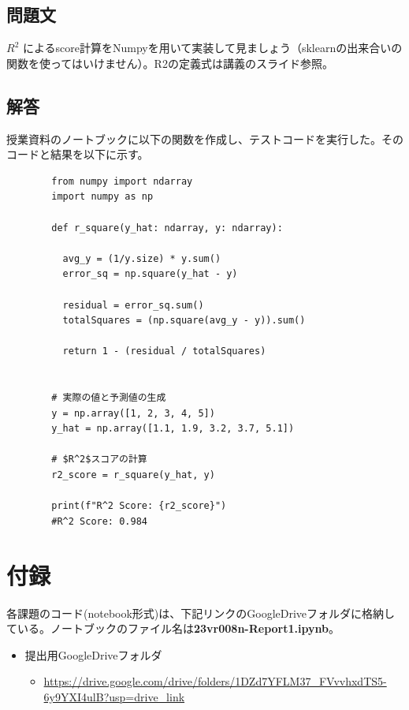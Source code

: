 \documentclass{article}[jsarticle]
\begin{document}
    \subsection{問題文}
    $R^2$ によるscore計算をNumpyを用いて実装して見ましょう（sklearnの出来合いの関数を使ってはいけません）。R2の定義式は講義のスライド参照。

    \subsection{解答}
    授業資料のノートブックに以下の関数を作成し、テストコードを実行した。そのコードと結果を以下に示す。
    \begin{lstlisting}
        from numpy import ndarray
        import numpy as np
        
        def r_square(y_hat: ndarray, y: ndarray):
        
          avg_y = (1/y.size) * y.sum()
          error_sq = np.square(y_hat - y)
          
          residual = error_sq.sum()
          totalSquares = (np.square(avg_y - y)).sum()
        
          return 1 - (residual / totalSquares)
        
        
        # 実際の値と予測値の生成
        y = np.array([1, 2, 3, 4, 5])
        y_hat = np.array([1.1, 1.9, 3.2, 3.7, 5.1])
        
        # $R^2$スコアの計算
        r2_score = r_square(y_hat, y)
        
        print(f"R^2 Score: {r2_score}")
        #R^2 Score: 0.984
    \end{lstlisting}
        
        

\section{付録}
各課題のコード(notebook形式)は、下記リンクのGoogleDriveフォルダに格納している。ノートブックのファイル名は\textbf{23vr008n-Report1.ipynb}。
\begin{itemize}
    \item 提出用GoogleDriveフォルダ
    \begin{itemize}
        \item \url{https://drive.google.com/drive/folders/1DZd7YFLM37_FVvvhxdTS5-6y9YXI4ulB?usp=drive_link}
    \end{itemize}
\end{itemize}
\end{document}
